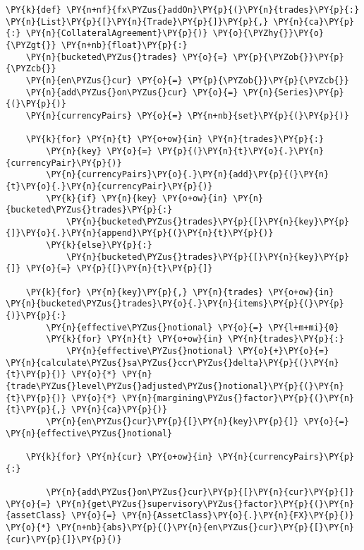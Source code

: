     \begin{tcolorbox}[breakable, size=fbox, boxrule=1pt, pad at break*=1mm,colback=cellbackground, colframe=cellborder]
\begin{Verbatim}[commandchars=\\\{\}]
\PY{k}{def} \PY{n+nf}{fx\PYZus{}addOn}\PY{p}{(}\PY{n}{trades}\PY{p}{:} \PY{n}{List}\PY{p}{[}\PY{n}{Trade}\PY{p}{]}\PY{p}{,} \PY{n}{ca}\PY{p}{:} \PY{n}{CollateralAgreement}\PY{p}{)} \PY{o}{\PYZhy{}}\PY{o}{\PYZgt{}} \PY{n+nb}{float}\PY{p}{:}
    \PY{n}{bucketed\PYZus{}trades} \PY{o}{=} \PY{p}{\PYZob{}}\PY{p}{\PYZcb{}}
    \PY{n}{en\PYZus{}cur} \PY{o}{=} \PY{p}{\PYZob{}}\PY{p}{\PYZcb{}}
    \PY{n}{add\PYZus{}on\PYZus{}cur} \PY{o}{=} \PY{n}{Series}\PY{p}{(}\PY{p}{)}
    \PY{n}{currencyPairs} \PY{o}{=} \PY{n+nb}{set}\PY{p}{(}\PY{p}{)}
    
    \PY{k}{for} \PY{n}{t} \PY{o+ow}{in} \PY{n}{trades}\PY{p}{:}
        \PY{n}{key} \PY{o}{=} \PY{p}{(}\PY{n}{t}\PY{o}{.}\PY{n}{currencyPair}\PY{p}{)}
        \PY{n}{currencyPairs}\PY{o}{.}\PY{n}{add}\PY{p}{(}\PY{n}{t}\PY{o}{.}\PY{n}{currencyPair}\PY{p}{)}
        \PY{k}{if} \PY{n}{key} \PY{o+ow}{in} \PY{n}{bucketed\PYZus{}trades}\PY{p}{:}
            \PY{n}{bucketed\PYZus{}trades}\PY{p}{[}\PY{n}{key}\PY{p}{]}\PY{o}{.}\PY{n}{append}\PY{p}{(}\PY{n}{t}\PY{p}{)}
        \PY{k}{else}\PY{p}{:}
            \PY{n}{bucketed\PYZus{}trades}\PY{p}{[}\PY{n}{key}\PY{p}{]} \PY{o}{=} \PY{p}{[}\PY{n}{t}\PY{p}{]}
            
    \PY{k}{for} \PY{n}{key}\PY{p}{,} \PY{n}{trades} \PY{o+ow}{in} \PY{n}{bucketed\PYZus{}trades}\PY{o}{.}\PY{n}{items}\PY{p}{(}\PY{p}{)}\PY{p}{:}
        \PY{n}{effective\PYZus{}notional} \PY{o}{=} \PY{l+m+mi}{0}
        \PY{k}{for} \PY{n}{t} \PY{o+ow}{in} \PY{n}{trades}\PY{p}{:}
            \PY{n}{effective\PYZus{}notional} \PY{o}{+}\PY{o}{=} \PY{n}{calculate\PYZus{}sa\PYZus{}ccr\PYZus{}delta}\PY{p}{(}\PY{n}{t}\PY{p}{)} \PY{o}{*} \PY{n}{trade\PYZus{}level\PYZus{}adjusted\PYZus{}notional}\PY{p}{(}\PY{n}{t}\PY{p}{)} \PY{o}{*} \PY{n}{margining\PYZus{}factor}\PY{p}{(}\PY{n}{t}\PY{p}{,} \PY{n}{ca}\PY{p}{)}
        \PY{n}{en\PYZus{}cur}\PY{p}{[}\PY{n}{key}\PY{p}{]} \PY{o}{=} \PY{n}{effective\PYZus{}notional}
        
    \PY{k}{for} \PY{n}{cur} \PY{o+ow}{in} \PY{n}{currencyPairs}\PY{p}{:}
        
        \PY{n}{add\PYZus{}on\PYZus{}cur}\PY{p}{[}\PY{n}{cur}\PY{p}{]} \PY{o}{=} \PY{n}{get\PYZus{}supervisory\PYZus{}factor}\PY{p}{(}\PY{n}{assetClass} \PY{o}{=} \PY{n}{AssetClass}\PY{o}{.}\PY{n}{FX}\PY{p}{)} \PY{o}{*} \PY{n+nb}{abs}\PY{p}{(}\PY{n}{en\PYZus{}cur}\PY{p}{[}\PY{n}{cur}\PY{p}{]}\PY{p}{)}
        

\end{Verbatim}
\end{tcolorbox}

